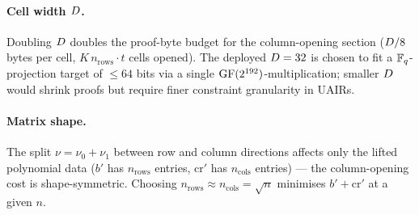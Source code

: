 \paragraph{Cell width $D$.} Doubling $D$ doubles the
proof-byte budget for the column-opening section ($D/8$ bytes per
cell, $K \, n_{\mathrm{rows}} \cdot t$ cells opened). The deployed
$D = 32$ is chosen to fit a $\mathbb{F}_q$-projection target of $\le 64$
bits via a single $\mathrm{GF}(2^{192})$-multiplication; smaller $D$ would shrink
proofs but require finer constraint granularity in UAIRs.

\paragraph{Matrix shape.} The split $\nu = \nu_0 + \nu_1$ between row
and column directions affects only the lifted polynomial data
($b'$ has $n_{\mathrm{rows}}$ entries, $\mathrm{cr}'$ has
$n_{\mathrm{cols}}$ entries) — the column-opening cost is
shape-symmetric. Choosing $n_{\mathrm{rows}} \approx n_{\mathrm{cols}}
= \sqrt{n}$ minimises $b' + \mathrm{cr}'$ at a given $n$.
